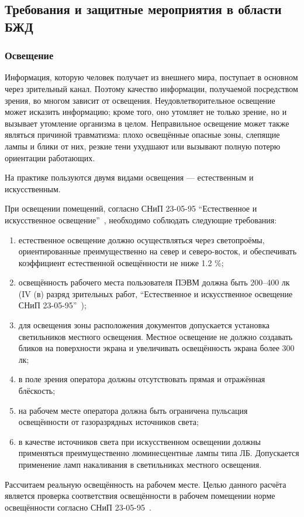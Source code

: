 \subsection{Требования и защитные мероприятия в области БЖД}
\subsubsection{Освещение}

Информация, которую человек получает из внешнего мира, поступает в основном через зрительный канал. Поэтому качество информации, получаемой посредством зрения, во многом зависит от освещения.
Неудовлетворительное освещение может исказить информацию; кроме того, оно утомляет не только зрение, но и вызывает утомление организма в целом. Неправильное освещение может также являться причиной травматизма: плохо освещённые опасные зоны, слепящие лампы и блики от них, резкие тени ухудшают или вызывают полную потерю ориентации работающих.

На практике пользуются двумя видами освещения — естественным и искусственным.

При освещении помещений, согласно СНиП 23-05-95 ``Естественное и искусственное освещение''~\cite{OT6}, необходимо соблюдать следующие требования:

\begin{enumerate}
\item естественное освещение должно осуществляться через светопроёмы, ориентированные преимущественно на север и северо-восток, и обеспечивать коэффициент естественной освещённости не ниже 1.2 \%;
\item освещённость рабочего места пользователя ПЭВМ должна быть 200--400 лк (IV (в) разряд зрительных работ, ``Естественное и искусственное освещение СНиП 23-05-95''~\cite{OT6});
\item для освещения зоны расположения документов допускается установка светильников местного освещения. Местное освещение не должно создавать бликов на поверхности экрана и увеличивать освещённость экрана более 300 лк;
\item в поле зрения оператора должны отсутствовать прямая и отражённая блёскость;
\item на рабочем месте оператора должна быть ограничена пульсация освещённости от газоразрядных источников света;
\item в качестве источников света при искусственном освещении должны применяться преимущественно люминесцентные лампы типа ЛБ. Допускается применение ламп накаливания в светильниках местного освещения.
\end{enumerate}
Рассчитаем реальную освещённость на рабочем месте. Целью данного расчёта является проверка соответствия освещённости в рабочем помещении норме освещённости согласно СНиП 23-05-95~\cite{OT6}.

